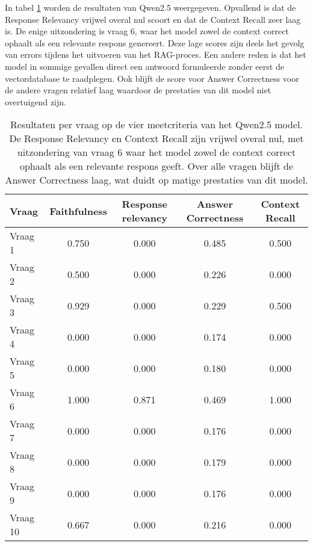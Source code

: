 In tabel \ref{tab:resultaten_vragen_qwen2.5} worden de resultaten van Qwen2.5 weergegeven. Opvallend is dat de Response Relevancy vrijwel overal nul scoort en dat de Context Recall zeer laag is. De enige uitzondering is vraag 6, waar het model zowel de context correct ophaalt als een relevante respons genereert. Deze lage scores zijn deels het gevolg van errors tijdens het uitvoeren van het RAG-proces. Een andere reden is dat het model in sommige gevallen direct een antwoord formuleerde zonder eerst de vectordatabase te raadplegen. Ook blijft de score voor Answer Correctness voor de andere vragen relatief laag waardoor de prestaties van dit model niet overtuigend zijn.

\begin{table}[H]
    \begin{tabular}{|l|c|c|c|c|}
        \hline
        \textbf{Vraag} & \textbf{Faithfulness} & \textbf{Response relevancy} & \textbf{Answer Correctness} & \textbf{Context Recall} \\
        \hline
        Vraag 1  & 0.750 & 0.000 & 0.485 & 0.500 \\
        Vraag 2  & 0.500 & 0.000 & 0.226 & 0.000 \\
        Vraag 3  & 0.929 & 0.000 & 0.229 & 0.500 \\
        Vraag 4  & 0.000 & 0.000 & 0.174 & 0.000 \\
        Vraag 5  & 0.000 & 0.000 & 0.180 & 0.000 \\
        Vraag 6  & 1.000 & 0.871 & 0.469 & 1.000 \\
        Vraag 7  & 0.000 & 0.000 & 0.176 & 0.000 \\
        Vraag 8  & 0.000 & 0.000 & 0.179 & 0.000 \\
        Vraag 9  & 0.000 & 0.000 & 0.176 & 0.000 \\
        Vraag 10 & 0.667 & 0.000 & 0.216 & 0.000 \\
        \hline
    \end{tabular}
    \caption{Resultaten per vraag op de vier meetcriteria van het Qwen2.5 model. De Response Relevancy en Context Recall zijn vrijwel overal nul, met uitzondering van vraag 6 waar het model zowel de context correct ophaalt als een relevante respons geeft. Over alle vragen blijft de Answer Correctness laag, wat duidt op matige prestaties van dit model.}
    \label{tab:resultaten_vragen_qwen2.5}
\end{table}


